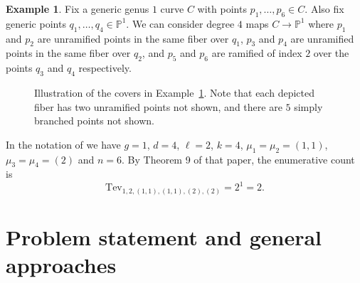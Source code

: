 \documentclass[11pt]{article}           %
\renewcommand{\P}{\mathbb P}
\theoremstyle{definition}
\newtheorem{eg}[thm]{Example}
\begin{document}
\begin{eg}
  \label{eg:tevelev}
  Fix a generic genus $1$ curve $C$ with points $p_1,\dots,p_6\in C$. Also fix generic points
  $q_1,\dots,q_4\in\P^1$. We can consider degree $4$ maps $C\to\P^1$ where $p_1$ and $p_2$ are unramified points in the same fiber over $q_1$, $p_3$ and $p_4$ are unramified points in the same fiber over $q_2$, and $p_5$ and $p_6$ are ramified of index $2$ over the points $q_3$ and $q_4$ respectively.

  \begin{figure}[h]
  \caption{Illustration of the covers in Example~\ref{eg:tevelev}. Note that each depicted fiber has two unramified points not shown, and there are $5$ simply branched points not shown.}
  \centering
{}

\label{fig:tevelev}
\end{figure}

  In the notation of \cite{Generalized} we have $g=1$, $d=4$, $\ell=2$, $k=4$, $\mu_1=\mu_2=(1,1)$, $\mu_3=\mu_4=(2)$ and $n=6$. By Theorem 9 of that paper, the enumerative count is
  \[
  \text{Tev}_{1,2,(1,1),(1,1),(2),(2)}=2^1=2.
  \]
\end{eg}

\section{Problem statement and general approaches}
\end{document}
